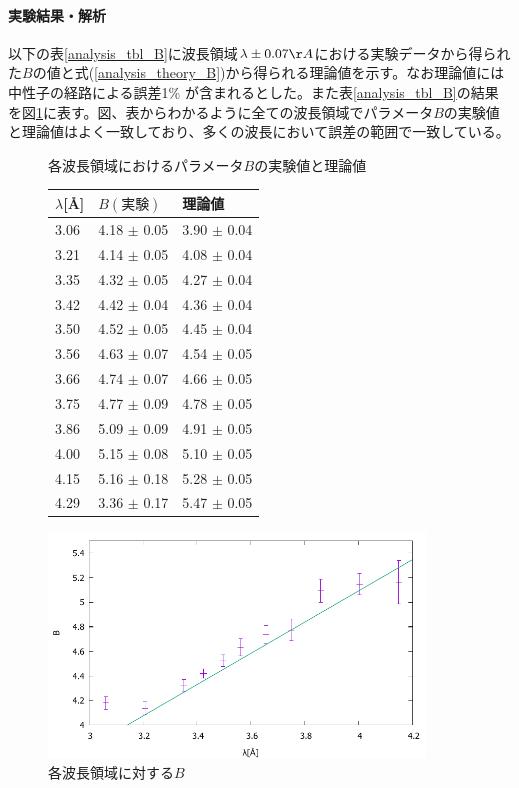 \paragraph{実験結果・解析}
以下の表\ref{analysis_tbl_B}に波長領域$\lambda \pm 0.07 \AA$における実験データから得られた$B$の値と式(\ref{analysis_theory_B})から得られる理論値を示す。なお理論値には中性子の経路による誤差1\% が含まれるとした。また表\ref{analysis_tbl_B}の結果を図\ref{analysis_fig_B}に表す。図、表からわかるように全ての波長領域でパラメータ$B$の実験値と理論値はよく一致しており、多くの波長において誤差の範囲で一致している。

\begin{figure}[h]
\begin{minipage}{0.35\hsize}
\centering
\makeatletter
\def\@captype{table}
\makeatother
\caption{各波長領域におけるパラメータ$B$の実験値と理論値} \label{analysis_tbl_B}
\begin{tabular}{lll}
$\lambda$[\AA] &  $B(実験)$ &   理論値 \\ \hline
3.06  & 4.18  $\pm$ 0.05  & 3.90  $\pm$ 0.04  \\
3.21  & 4.14  $\pm$ 0.05  & 4.08  $\pm$ 0.04  \\
3.35  & 4.32  $\pm$ 0.05  & 4.27  $\pm$ 0.04  \\
3.42  & 4.42  $\pm$ 0.04  & 4.36  $\pm$ 0.04  \\
3.50  & 4.52  $\pm$ 0.05  & 4.45  $\pm$ 0.04  \\
3.56  & 4.63  $\pm$ 0.07  & 4.54  $\pm$ 0.05  \\
3.66  & 4.74  $\pm$ 0.07  & 4.66  $\pm$ 0.05  \\
3.75  & 4.77  $\pm$ 0.09  & 4.78  $\pm$ 0.05  \\
3.86  & 5.09  $\pm$ 0.09  & 4.91  $\pm$ 0.05  \\
4.00  & 5.15  $\pm$ 0.08  & 5.10  $\pm$ 0.05  \\
4.15  & 5.16  $\pm$ 0.18  & 5.28  $\pm$ 0.05  \\
4.29  & 3.36  $\pm$ 0.17  & 5.47  $\pm$ 0.05  \\ \hline
\end{tabular}
\end{minipage}
\begin{minipage}{0.65\hsize}
\centering
\vspace{2.5cm}
\includegraphics[width=10cm]{analysis/B/B_F.pdf}
\caption{各波長領域に対する$B$} \label{analysis_fig_B}
\end{minipage}
\end{figure}

